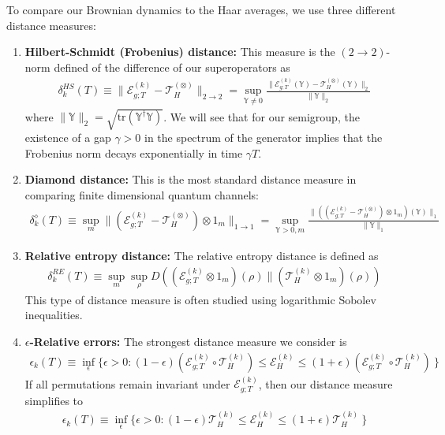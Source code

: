 \documentclass{article}
\theoremstyle{definition}
\newcommand{\Tr}{\text{tr}}
\newcommand{\ep}{\epsilon}
\newcommand{\mT}{\mathcal{T}}
\begin{document}
    To compare our Brownian dynamics to the Haar averages, we use three different
    distance measures:
    \begin{enumerate}
        \item {\bf Hilbert-Schmidt (Frobenius) distance:} This measure is the $(2
            \to 2)$-norm defined of the difference of our superoperators as
            \begin{eqnarray}
                \delta^{HS}_k(T)\equiv \|\mathcal{E}_{g;T}^{(k)}-\mT^{(\otimes)}_H\|_{2\to 2}=\sup_{\mathbb{Y}\neq 0}
                \frac{\|\mathcal{E}_{g;T}^{(k)}(\mathbb{Y})-\mT^{(\otimes)}_{H}(\mathbb{Y})\|_{2}}{\|\mathbb{Y}\|_{2}}
            \end{eqnarray}
            where $\|\mathbb{Y}\|_{2}=\sqrt{\Tr(\mathbb{Y}^{\dagger}\mathbb{Y})}$.
            We will see that for our semigroup, the existence of a gap $\gamma>0$
            in the spectrum of the generator implies that the Frobenius norm decays
            exponentially in time $\gamma T$.

        \item {\bf Diamond distance:} This is the most standard distance measure
            in comparing finite dimensional quantum channels:
            \begin{eqnarray}
                \delta_k^{\diamond}(T)\equiv\sup_m\|(\mathcal{E}_{g;T}^{(k)}-\mT^{(\otimes)}_H)\otimes
                1_m\|_{1\to 1}=\sup_{\mathbb{Y}>0,m}
                \frac{\|((\mathcal{E}_{g;T}^{(k)}-\mT^{(\otimes)}_{H})\otimes 1_{m})(\mathbb{Y})\|_{1}}{\|\mathbb{Y}\|_{1}}
            \end{eqnarray}

        \item {\bf Relative entropy distance:} The relative entropy distance is defined
            as
            \begin{eqnarray}
                \delta^{RE}_k(T)\equiv\sup_m\sup_\rho D((\mathcal{E}^{(k)}_{g;T}\otimes
                1_m)(\rho)\|(\mathcal{T}^{(k)}_H\otimes 1_m)(\rho))
            \end{eqnarray}
            This type of distance measure is often studied using logarithmic Sobolev
            inequalities.

        \item {\bf $\ep$-Relative errors:} The strongest distance measure we consider
            is
            \begin{eqnarray}
                \ep_k(T)\equiv \inf_\ep\{\ep>0:(1-\ep)(\mathcal{E}^{(k)}_{g;T}\circ
                \mathcal{T}^{(k)}_H)\leq \mathcal{E}^{(k)}_H\leq (1+\ep)(\mathcal{E}^{(k)}_{g;T}\circ
                \mathcal{T}^{(k)}_H)\:\}
            \end{eqnarray}
            If all permutations remain invariant under $\mathcal{E}^{(k)}_{g;T}$,
            then our distance measure simplifies to
            \begin{eqnarray}
                \ep_k(T)\equiv \inf_\ep\{\ep>0:(1-\ep)\mathcal{T}^{(k)}_H\leq \mathcal{E}^{(k)}_H\leq
                (1+\ep)\mathcal{T}^{(k)}_H\:\}
            \end{eqnarray}
    \end{enumerate}
\end{document}
